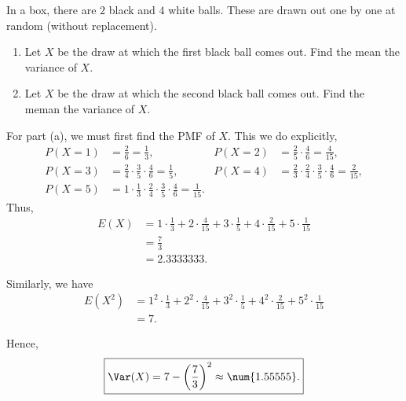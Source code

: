 \begin{problem}[Handout 7, \# 9]
  In a box, there are \(2\) black and \(4\) white balls. These are drawn
  out one by one at random (without replacement).
  \begin{enumerate}[label=(\alph*),noitemsep]
  \item Let \(X\) be the draw at which the first black ball comes out. Find
    the mean the variance of \(X\).
  \item Let \(X\) be the draw at which the second black ball comes
    out. Find the meman the variance of \(X\).
  \end{enumerate}
\end{problem}
\begin{solution}
  For part (a), we must first find the PMF of \(X\). This we do explicitly,
  \begin{align*}
    P(X=1)&=\frac{2}{6}=\frac{1}{3},
    &P(X=2)&=\frac{2}{5}\cdot\frac{4}{6}=\frac{4}{15},\\
    P(X=3)&=\frac{2}{4}\cdot\frac{3}{5}\cdot\frac{4}{6}=\frac{1}{5},
    &P(X=4)&=\frac{2}{3}\cdot\frac{2}{4}\cdot\frac{3}{5}\cdot\frac{4}{6}=\frac{2}{15},\\
    P(X=5)&=1\cdot\frac{1}{3}\cdot\frac{2}{4}\cdot\frac{3}{5}\cdot\frac{4}{6}=\frac{1}{15}.
  \end{align*}
  Thus,
  \[
    \boxed{
      \begin{aligned}
        E(X)
        &=1\cdot\frac{1}{3}+2\cdot\frac{4}{15}+3\cdot\frac{1}{5}+4\cdot\frac{2}{15}+5\cdot\frac{1}{15}\\
        &=\frac{7}{3}\\
        &=\num{2.3333333}.
      \end{aligned}}
  \]

  Similarly, we have
  \[
    \begin{aligned}
      E(X^2)
      &=1^2\cdot\frac{1}{3}+2^2\cdot\frac{4}{15}+3^2\cdot\frac{1}{5}+4^2\cdot\frac{2}{15}+5^2\cdot\frac{1}{15}\\
      &=7.
    \end{aligned}
  \]

  Hence,
  \[
    \boxed{\Var(X)=7-\left(\frac{7}{3}\right)^2\approx\num{1.55555}.}
  \]


\end{solution}
